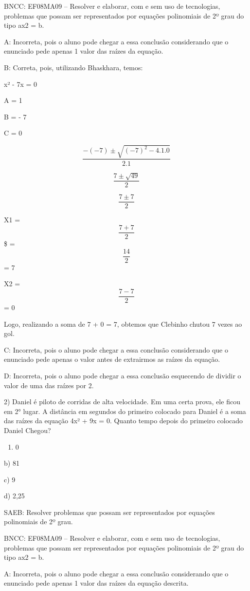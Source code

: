 BNCC: EF08MA09 -- Resolver e elaborar, com e sem uso de tecnologias,
problemas que possam ser representados por equações polinomiais de 2º
grau do tipo ax2 = b.

A: Incorreta, pois o aluno pode chegar a essa conclusão considerando que
o enunciado pede apenas 1 valor das raízes da equação.

B: Correta, pois, utilizando Bhaskhara, temos:

x² - 7x = 0

A = 1

B = - 7

C = 0

\[\frac{- ( - 7) \pm \sqrt{{( - 7)}^{2} - 4.1.0}}{2.1}\]

\[\frac{7 \pm \sqrt{49}}{2}\]

\[\frac{7 \pm 7}{2}\]

X1 = \[\frac{7 + 7}{2}\]\$ = \[\frac{14}{2}\] = 7

X2 = \[\frac{7 - 7}{2}\] = 0

Logo, realizando a soma de 7 + 0 = 7, obtemos que Clebinho chutou 7
vezes ao gol.

C: Incorreta, pois o aluno pode chegar a essa conclusão considerando que
o enunciado pede apenas o valor antes de extrairmos as raízes da
equação.

D: Incorreta, pois o aluno pode chegar a essa conclusão esquecendo de
dividir o valor de uma das raízes por 2.

2) Daniel é piloto de corridas de alta velocidade. Em uma certa prova,
ele ficou em 2° lugar. A distância em segundos do primeiro colocado para
Daniel é a soma das raízes da equação 4x² + 9x = 0. Quanto tempo depois
do primeiro colocado Daniel Chegou?

\begin{enumerate}
\def\labelenumi{\alph{enumi})}
\tightlist
\item
  0
\end{enumerate}

b) 81

c) 9

d) 2,25

SAEB: Resolver problemas que possam ser representados por equações
polinomiais de 2º grau.

BNCC: EF08MA09 -- Resolver e elaborar, com e sem uso de tecnologias,
problemas que possam ser representados por equações polinomiais de 2º
grau do tipo ax2 = b.

A: Incorreta, pois o aluno pode chegar a essa conclusão considerando que
o enunciado pede apenas 1 valor das raízes da equação descrita.

